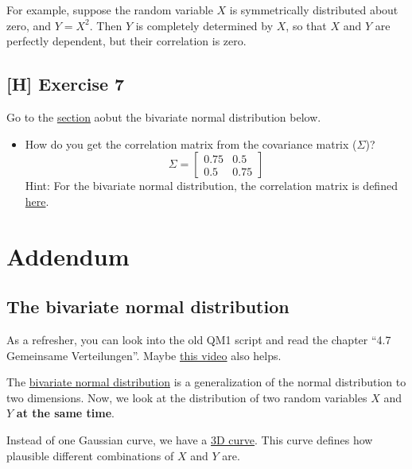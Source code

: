 \documentclass[
]{book}
\providecommand{\tightlist}{%
  \setlength{\itemsep}{0pt}\setlength{\parskip}{0pt}}
\begin{document}
For example, suppose the random variable \(X\) is symmetrically distributed about zero,
and \(Y = X^2\). Then \(\mathit{Y}\) is completely determined by \(X\), so that
\(\mathit{X}\) and \(\mathit{Y}\) are perfectly dependent, but their correlation is zero.

\subsection{{[}H{]} Exercise 7}\label{exercise7_Intro}

Go to the \hyperref[bivariate_normal]{section} aobut the bivariate normal distribution below.

\begin{itemize}
\tightlist
\item
  How do you get the correlation matrix from the covariance matrix (\(\Sigma\))?
  \[
  \Sigma =
  \begin{bmatrix}
  0.75 & 0.5 \\
  0.5 & 0.75
  \end{bmatrix}
  \]
  Hint: For the bivariate normal distribution, the correlation matrix is defined \href{https://en.wikipedia.org/wiki/Multivariate_normal_distribution\#Bivariate_case}{here}.
\end{itemize}

\section{Addendum}\label{addendum}

\subsection{The bivariate normal distribution}\label{bivariate_normal}

As a refresher, you can look into the old QM1 script and read the
chapter ``4.7 Gemeinsame Verteilungen''.
Maybe \href{https://www.youtube.com/watch?v=SP2GKq8xJ5I&ab_channel=StatisticsNinja}{this video}
also helps.

The \href{https://en.wikipedia.org/wiki/Multivariate_normal_distribution}{bivariate normal distribution}
is a generalization of the normal distribution to two dimensions.
Now, we look at the distribution of two random variables \(X\) and \(Y\) \textbf{at the same time}.

Instead of one Gaussian curve, we have a
\href{https://en.wikipedia.org/wiki/Multivariate_normal_distribution\#/media/File:Multivariate_Gaussian.png}{3D curve}.
This curve defines how plausible different combinations of \(X\) and \(Y\) are.
\end{document}
